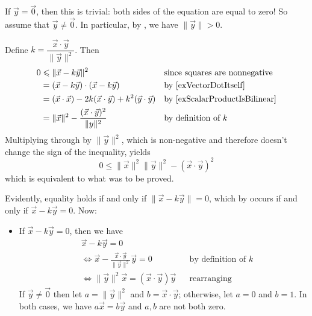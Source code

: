 \begin{cproof}
If $\vec y = \vec 0$, then this is trivial: both sides of the equation are equal to zero! So assume that $\vec y \ne \vec 0$. In particular, by , we have $\lVert \vec y \rVert > 0$.

Define $k = \dfrac{\vec x \cdot \vec y}{\lVert \vec y \rVert^2}$. Then
\begin{align*}
0 &\le \lVert \vec x - k \vec y \rVert^2 && \text{since squares are nonnegative} \\
&= (\vec x - k \vec y) \cdot (\vec x - k \vec y) && \text{by \Cref{exVectorDotItself}} \\
&= (\vec x \cdot \vec x) - 2k (\vec x \cdot \vec y) + k^2 (\vec y \cdot \vec y) && \text{by \Cref{exScalarProductIsBilinear}} \\
&= \lVert \vec x \rVert^2 - \frac{(\vec x \cdot \vec y)^2}{\lVert y \rVert^2} && \text{by definition of $k$}
\end{align*}
Multiplying through by $\lVert \vec y \rVert^2$, which is non-negative and therefore doesn't change the sign of the inequality, yields
\[ 0 \le \lVert \vec x \rVert^2 \lVert \vec y \rVert^2 - (\vec x \cdot \vec y)^2 \]
which is equivalent to what was to be proved.

Evidently, equality holds if and only if $\lVert \vec x - k \vec y \rVert = 0$, which by  occurs if and only if $\vec x - k \vec y = 0$. Now:
\begin{itemize}
\item If $\vec x - k\vec y = 0$, then we have
\begin{align*}
&\vec x - k \vec y = 0 && \\
&\Leftrightarrow \vec x - \frac{\vec x \cdot \vec y}{\lVert \vec y \rVert^2} \vec y = 0 && \text{by definition of $k$} \\
&\Leftrightarrow \lVert \vec y \rVert^2 \vec x = (\vec x \cdot \vec y) \vec y && \text{rearranging}
\end{align*}
If $\vec y \ne \vec 0$ then let $a=\lVert \vec y \rVert^2$ and $b=\vec x \cdot \vec y$; otherwise, let $a=0$ and $b=1$. In both cases, we have $a \vec x = b \vec y$ and $a,b$ are not both zero.


\end{itemize}
\end{cproof}
